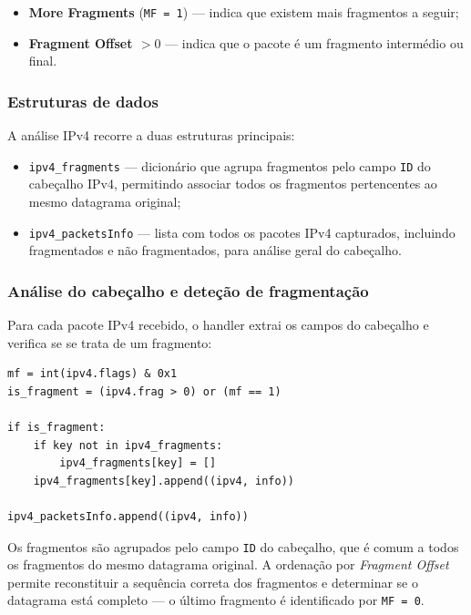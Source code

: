 \documentclass[a4paper,12pt]{article}
\begin{document}
\begin{itemize}
    \item \textbf{More Fragments} (\texttt{MF = 1}) — indica que existem mais fragmentos a seguir;
    \item \textbf{Fragment Offset $> 0$} — indica que o pacote é um fragmento intermédio ou final.
\end{itemize}

\subsubsection{Estruturas de dados}

A análise IPv4 recorre a duas estruturas principais:

\begin{itemize}
    \item \texttt{ipv4\_fragments} — dicionário que agrupa fragmentos pelo campo \texttt{ID} do cabeçalho IPv4, permitindo associar todos os fragmentos pertencentes ao mesmo datagrama original;
    \item \texttt{ipv4\_packetsInfo} — lista com todos os pacotes IPv4 capturados, incluindo fragmentados e não fragmentados, para análise geral do cabeçalho.
\end{itemize}

\subsubsection{Análise do cabeçalho e deteção de fragmentação}

Para cada pacote IPv4 recebido, o handler extrai os campos do cabeçalho e verifica se se trata de um fragmento:

\vspace{0.5em}

\begin{lstlisting}[style=python]
mf = int(ipv4.flags) & 0x1
is_fragment = (ipv4.frag > 0) or (mf == 1)

if is_fragment:
    if key not in ipv4_fragments:
        ipv4_fragments[key] = []
    ipv4_fragments[key].append((ipv4, info))

ipv4_packetsInfo.append((ipv4, info))
\end{lstlisting}

Os fragmentos são agrupados pelo campo \texttt{ID} do cabeçalho, que é comum a todos os
fragmentos do mesmo datagrama original. A ordenação por \textit{Fragment Offset} permite
reconstituir a sequência correta dos fragmentos e determinar se o datagrama está completo
— o último fragmento é identificado por \texttt{MF = 0}.
\end{document}
